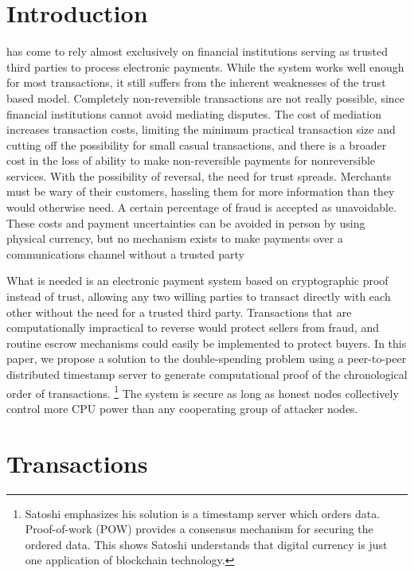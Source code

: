 \documentclass[nohyper]{tufte-handout}
\begin{document}
\section{Introduction}\label{introduction}

 has come to rely almost exclusively on
financial institutions serving as trusted third parties to process
electronic payments. While the system works well enough for most
transactions, it still suffers from the inherent weaknesses of the trust
based model. Completely non-reversible transactions are not really
possible, since financial institutions cannot avoid mediating disputes.
The cost of mediation increases transaction costs, limiting the minimum
practical transaction size and cutting off the possibility for small
casual transactions, and there is a broader cost in the loss of ability
to make non-reversible payments for nonreversible services. With the
possibility of reversal, the need for trust spreads. Merchants must be
wary of their customers, hassling them for more information than they
would otherwise need. A certain percentage of fraud is accepted as
unavoidable. These costs and payment uncertainties can be avoided in
person by using physical currency, but no mechanism exists to make
payments over a communications channel without a trusted party

What is needed is an electronic payment system based on cryptographic
proof instead of trust, allowing any two willing parties to transact
directly with each other without the need for a trusted third party.
Transactions that are computationally impractical to reverse would
protect sellers from fraud, and routine escrow mechanisms could easily
be implemented to protect buyers. In this paper, we propose a solution
to the double-spending problem using a peer-to-peer distributed
timestamp server to generate computational proof of the chronological
order of transactions.  \footnote{Satoshi emphasizes his solution is a timestamp server which orders data.  Proof-of-work (POW) provides a consensus mechanism for securing the ordered data. This shows Satoshi understands that digital currency is just one application of blockchain technology.} The system is secure as long as honest nodes
collectively control more CPU power than any cooperating group of
attacker nodes.

\section{Transactions}\label{transactions}
\end{document}
